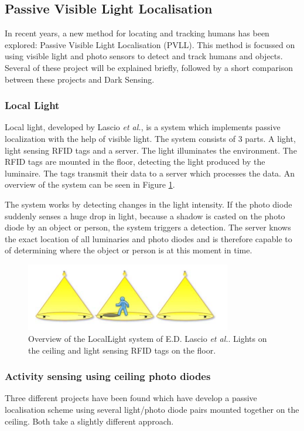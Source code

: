 \subsection{Passive Visible Light Localisation}
In recent years, a new method for locating and tracking humans has been explored: Passive Visible Light Localisation (PVLL). This method is focussed on using visible light and photo sensors to detect and track humans and objects. Several of these project will be explained briefly, followed by a short comparison between these projects and Dark Sensing.

\subsubsection{Local Light}
Local light, developed by Lascio \textit{et al.}\cite{LocaLight}, is a system which implements passive localization with the help of visible light. The system consists of 3 parts. A light, light sensing RFID tags and a server. The light illuminates the environment. The RFID tags are mounted in the floor, detecting the light produced by the luminaire. The tags transmit their data to a server which processes the data. An overview of the system can be seen in Figure \ref{fig:LocalLight}.

The system works by detecting changes in the light intensity. If the photo diode suddenly senses a huge drop in light, because a shadow is casted on the photo diode by an object or person, the system triggers a detection. The server knows the exact location of all luminaries and photo diodes and is therefore capable to of determining where the object or person is at this moment in time.

\begin{figure}[]
	\centering
	\includegraphics[width=90mm]{pics/LocalLight.png}
	\caption{Overview of the LocalLight system of E.D. Lascio \textit{et al.}\cite{LocaLight}. Lights on the ceiling and light sensing RFID tags on the floor.\label{fig:LocalLight}}
\end{figure}

\subsubsection{Activity sensing using ceiling photo diodes}
Three different projects have been found which have develop a passive localisation scheme using several light/photo diode pairs mounted together on the ceiling. Both take a slightly different approach.

